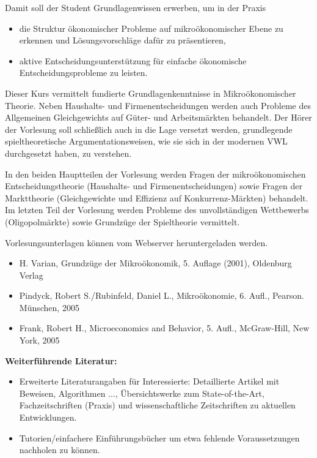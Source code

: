\begin{course}
\begin{learningoutcomes}
Damit soll der Student Grundlagenwissen erwerben, um in der Praxis

 \begin{itemize}\item die Struktur ökonomischer Probleme auf mikroökonomischer Ebene zu erkennen und Lösungsvorschläge dafür zu präsentieren,  \item aktive Entscheidungsunterstützung für einfache ökonomische Entscheidungsprobleme zu leisten.  \end{itemize}
\end{learningoutcomes}

\begin{content}
Dieser Kurs vermittelt fundierte Grundlagenkenntnisse in Mikroökonomischer Theorie. Neben Haushalts- und Firmenentscheidungen werden auch Probleme des Allgemeinen Gleichgewichts auf Güter- und Arbeitsmärkten behandelt. Der Hörer der Vorlesung soll schließlich auch in die Lage versetzt werden, grundlegende spieltheoretische Argumentationsweisen, wie sie sich in der modernen VWL durchgesetzt haben, zu verstehen.

 

In den beiden Hauptteilen der Vorlesung werden Fragen der mikroökonomischen Entscheidungstheorie (Haushalts- und Firmenentscheidungen) sowie Fragen der Markttheorie (Gleichgewichte und Effizienz auf Konkurrenz-Märkten) behandelt. Im letzten Teil der Vorlesung werden Probleme des unvollständigen Wettbewerbs (Oligopolmärkte) sowie Grundzüge der Spieltheorie vermittelt.


\end{content}

\begin{media}Vorlesungsunterlagen können vom Webserver heruntergeladen werden.

\end{media}

\begin{literature}\begin{itemize}\item H. Varian, Grundzüge der Mikroökonomik, 5. Auflage (2001), Oldenburg Verlag  \item Pindyck, Robert S./Rubinfeld, Daniel L., Mikroökonomie, 6. Aufl., Pearson. Münschen, 2005  \item Frank, Robert H., Microeconomics and Behavior, 5. Aufl., McGraw-Hill, New York, 2005  \end{itemize}

\textbf{Weiterführende Literatur:}

 \begin{itemize}\item Erweiterte Literaturangaben für Interessierte: Detaillierte Artikel mit Beweisen, Algorithmen ..., Übersichtswerke zum State-of-the-Art, Fachzeitschriften (Praxis) und wissenschaftliche Zeitschriften zu aktuellen Entwicklungen.  \item Tutorien/einfachere Einführungsbücher um etwa fehlende Voraussetzungen nachholen zu können.  \end{itemize}\end{literature}



\end{course}